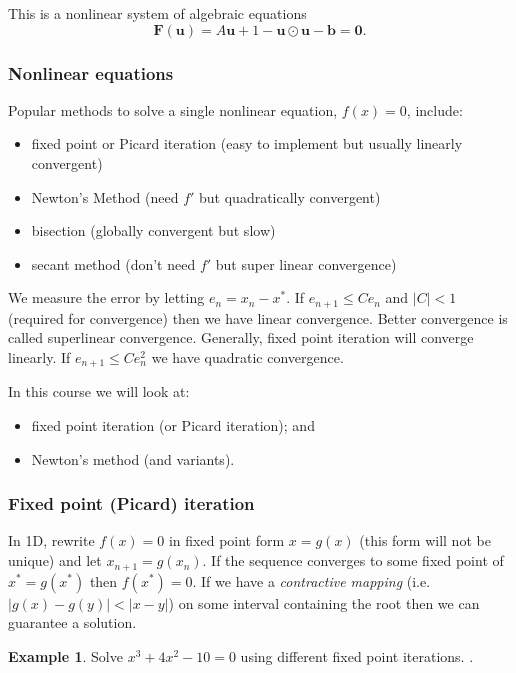 \documentclass[12pt, a4paper]{article}
\renewcommand{\vec}[1]{\mathbf{#1}}
\theoremstyle{definition}
\newtheorem{example}[thm]{Example}
\theoremstyle{remark}
\numberwithin{equation}{section}
\begin{document}
This is a nonlinear system of algebraic equations
 \[\vec{F}(\vec{u})=A\vec{u} + 1-\vec{u}\odot\vec{u}-\vec{b}=\vec{0}.\]
 
 \newpage
 \subsubsection{Nonlinear equations}
 Popular methods to solve a single  nonlinear equation, $f(x) = 0$, include:
\begin{itemize}
  \item fixed point or Picard iteration (easy to implement but usually linearly convergent)
  \item Newton's Method (need $f'$ but quadratically convergent)
  \item bisection (globally convergent but slow)
  \item secant method (don't need $f'$ but super linear convergence)
\end{itemize} 

We measure the error by letting $e_n=x_n-x^*$. If $e_{n+1} \le C e_n$ and $|C| <1$ (required for convergence) then we have linear convergence. Better convergence is called superlinear convergence. Generally, fixed point iteration will converge linearly. If $e_{n+1} \le C e_n ^2 $ we have quadratic convergence.


In this course we will look at: 
\begin{itemize}
\item fixed point iteration (or Picard iteration); and
\item Newton's method (and variants).
\end{itemize}

\newpage
\subsubsection{Fixed point (Picard) iteration}

In 1D, rewrite $f(x)=0$ in fixed point form $x=g(x)$ (this form will not be unique) and let $x_{n+1}=g(x_n)$. If the sequence converges to some fixed point of  $x^*=g(x^*)$ then $f(x^*)=0$. If we have a \emph{contractive mapping} (i.e.\ $|g(x)-g(y)| < |x-y|$) on some interval containing the root then we can guarantee a solution.


 \begin{example}
 Solve $x^3 +4x^2-10=0$ using different fixed point iterations.
 .
 \end{example}
\end{document}
